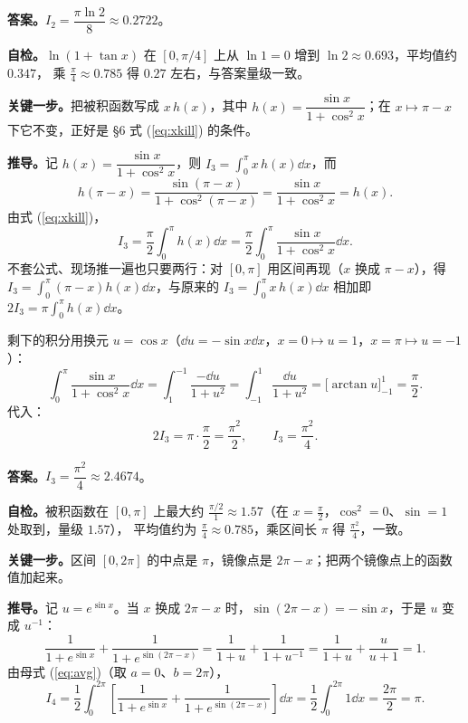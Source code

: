 \documentclass[11pt]{ctexart}
\newcommand{\qhalf}{\needspace{0.50\textheight}}
\begin{document}
\textbf{答案。}$I_2=\dfrac{\pi\ln 2}{8}\approx 0.2722$。

\textbf{自检。}$\ln(1+\tan x)$ 在 $[0,\pi/4]$ 上从 $\ln 1=0$ 增到 $\ln 2\approx 0.693$，平均值约 $0.347$，
乘 $\frac{\pi}{4}\approx 0.785$ 得 $0.27$ 左右，与答案量级一致。

\qhalf
{}
\label{sol3}

\textbf{关键一步。}把被积函数写成 $x\,h(x)$，其中 $h(x)=\dfrac{\sin x}{1+\cos^2x}$；在 $x\mapsto\pi-x$ 下它不变，正好是 §6 式 (\ref{eq:xkill}) 的条件。

\textbf{推导。}记 $h(x)=\dfrac{\sin x}{1+\cos^2x}$，则 $I_3=\displaystyle\int_0^{\pi} x\,h(x)\dd x$，而
\[
h(\pi-x)=\frac{\sin(\pi-x)}{1+\cos^{2}(\pi-x)}=\frac{\sin x}{1+\cos^{2}x}=h(x).
\]
由式 (\ref{eq:xkill})，
\[
I_3=\frac{\pi}{2}\int_0^{\pi}h(x)\dd x=\frac{\pi}{2}\int_0^{\pi}\frac{\sin x}{1+\cos^2x}\dd x .
\]
不套公式、现场推一遍也只要两行：对 $[0,\pi]$ 用区间再现（$x$ 换成 $\pi-x$），得
$I_3=\int_0^{\pi}(\pi-x)h(x)\dd x$，与原来的 $I_3=\int_0^{\pi}x\,h(x)\dd x$ 相加即 $2I_3=\pi\int_0^{\pi}h(x)\dd x$。

剩下的积分用换元 $u=\cos x$（$\dd u=-\sin x\dd x$，$x=0\mapsto u=1$，$x=\pi\mapsto u=-1$）：
\[
\int_0^{\pi}\frac{\sin x}{1+\cos^2x}\dd x=\int_1^{-1}\frac{-\dd u}{1+u^2}=\int_{-1}^{1}\frac{\dd u}{1+u^2}
=\Big[\arctan u\Big]_{-1}^{1}=\frac{\pi}{2}.
\]
代入：
\[
2I_3=\pi\cdot\frac{\pi}{2}=\frac{\pi^2}{2},\qquad I_3=\frac{\pi^{2}}{4}.
\]

\textbf{答案。}$I_3=\dfrac{\pi^2}{4}\approx 2.4674$。

\textbf{自检。}被积函数在 $[0,\pi]$ 上最大约 $\frac{\pi/2}{1}\approx 1.57$（在 $x=\frac{\pi}{2}$，$\cos^2=0$、$\sin=1$ 处取到，量级 $1.57$），
平均值约为 $\frac{\pi}{4}\approx 0.785$，乘区间长 $\pi$ 得 $\frac{\pi^2}{4}$，一致。


\qhalf
{}
\label{sol4}

\textbf{关键一步。}区间 $[0,2\pi]$ 的中点是 $\pi$，镜像点是 $2\pi-x$；把两个镜像点上的函数值加起来。

\textbf{推导。}记 $u=e^{\sin x}$。当 $x$ 换成 $2\pi-x$ 时，$\sin(2\pi-x)=-\sin x$，于是 $u$ 变成 $u^{-1}$：
\[
\frac{1}{1+e^{\sin x}}+\frac{1}{1+e^{\sin(2\pi-x)}}=\frac{1}{1+u}+\frac{1}{1+u^{-1}}
=\frac{1}{1+u}+\frac{u}{u+1}=1 .
\]
由母式 (\ref{eq:avg})（取 $a=0$、$b=2\pi$），
\[
I_4=\frac12\int_0^{2\pi}\left[\frac{1}{1+e^{\sin x}}+\frac{1}{1+e^{\sin(2\pi-x)}}\right]\dd x
=\frac12\int_0^{2\pi}1\dd x=\frac{2\pi}{2}=\pi .
\]
\end{document}
